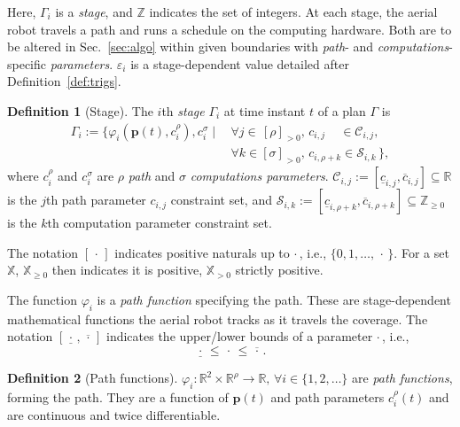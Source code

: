 \documentclass[letterpaper,10pt,journal,twoside]{IEEEtran}
\theoremstyle{definition}
\newtheorem{defn}{Definition}[section]
\begin{document}
Here, $\Gamma_i$ is a \emph{stage}, and $\mathbb{Z}$ indicates the set of integers. At each stage, the aerial robot travels a path and runs a schedule on the computing hardware. Both are to be altered in Sec.~\ref{sec:algo} within given boundaries with \emph{path}- and \emph{computations}-specific \emph{parameters}. $\varepsilon_i$ is a stage-dependent value detailed %
after Definition~\ref{def:trigs}.

\begin{defn}[Stage]\label{def:stage}
  The $i$th \emph{stage} $\Gamma_i$ at time instant $t$ of a plan $\Gamma$ is
  \begin{equation*}\begin{split}
    \Gamma_i:=\{\varphi_i(\mathbf{p}(t),c_i^\rho),c_i^\sigma\mid
    \,&\forall j\in\,[\rho]_{>0},\,c_{i,j}\,\,\,\,\,\,\,\in\mathcal{C}_{i,j},\,\\
      &\forall k\in[\sigma]_{>0},\,c_{i,\rho+k}\in\mathcal{S}_{i,k}\,\},
  \end{split}\end{equation*}
  where $c_i^\rho$ and $c_i^\sigma$ are $\rho$ \emph{path} and $\sigma$ \emph{computations parameters}. $\mathcal{C}_{i,j}:=[\underline{c}_{i,j},\overline{c}_{i,j}]\subseteq\mathbb{R}$ is the $j$th path parameter $c_{i,j}$ constraint set, and $\mathcal{S}_{i,k}:=[\underline{c}_{i,\rho+k},\overline{c}_{i,\rho+k}]\subseteq\mathbb{Z}_{\geq 0}$ is the $k$th computation parameter constraint set.
\end{defn}

The notation $[\,\cdot\,]$ indicates positive naturals up to $\cdot$\,, i.e., $\{0,1,\dots,\,\cdot\,\}$.
For a set $\mathbb{X}$, $\mathbb{X}_{\geq 0}$ then indicates it is positive, $\mathbb{X}_{> 0}$ strictly positive.

The function $\varphi_i$ is a \emph{path function} specifying the path. These are stage-dependent mathematical functions the aerial robot tracks as it travels %
the coverage. The notation $[\underline{\,\cdot\,},\overline{\,\cdot\,}]$ indicates the upper/lower bounds of a parameter $\cdot\,$, i.e.,
\begin{equation}
  \underline{\,\cdot\,}\leq\,\cdot\,\leq\overline{\,\cdot\,}.
\end{equation}





\begin{defn}[Path functions]
  \label{def:paths}
  $\varphi_i:\mathbb{R}^2\times\mathbb{R}^\rho\rightarrow\mathbb{R},\,\forall i\in\{1,2,\dots\}
  $ are \emph{path functions}, forming the path. They are a function of $\mathbf{p}(t)$ and path parameters $c_i^\rho(t)$ and are continuous and twice differentiable.
\end{defn}
\end{document}

